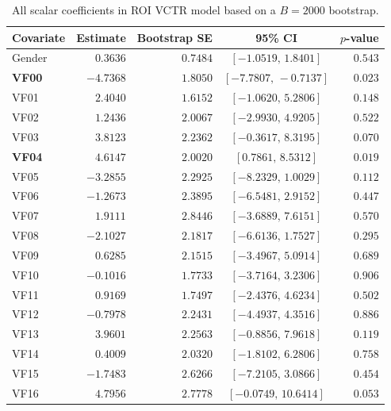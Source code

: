 \documentclass[10pt]{notes}
\begin{document}
\begin{landscape}
\begin{table}[p]
    \centering
    \setlength{\tabcolsep}{3.5pt}
    \renewcommand{\arraystretch}{1.02}
    \caption{All scalar coefficients in ROI VCTR model based
    on a $B=2000$ bootstrap.}
    \label{tab:grape-roi-xz-beta}
    \begin{minipage}[t]{0.49\linewidth}
    \centering
    \begin{tabular}{lrrcr}
    \hline
    Covariate & Estimate & Bootstrap SE & 95\% CI & $p$-value \\
    \hline
    Gender & $0.3636$ & $0.7484$ & $[-1.0519,\,1.8401]$ & $0.543$ \\
    \textbf{VF00} & $\mathbf{-4.7368}$ & $\mathbf{1.8050}$ & $\mathbf{[-7.7807,\,-0.7137]}$ & $\mathbf{0.023}$ \\
    VF01 & $2.4040$ & $1.6152$ & $[-1.0620,\,5.2806]$ & $0.148$ \\
    VF02 & $1.2436$ & $2.0067$ & $[-2.9930,\,4.9205]$ & $0.522$ \\
    VF03 & $3.8123$ & $2.2362$ & $[-0.3617,\,8.3195]$ & $0.070$ \\
    \textbf{VF04} & $\mathbf{4.6147}$ & $\mathbf{2.0020}$ & $\mathbf{[0.7861,\,8.5312]}$ & $\mathbf{0.019}$ \\
    VF05 & $-3.2855$ & $2.2925$ & $[-8.2329,\,1.0029]$ & $0.112$ \\
    VF06 & $-1.2673$ & $2.3895$ & $[-6.5481,\,2.9152]$ & $0.447$ \\
    VF07 & $1.9111$ & $2.8446$ & $[-3.6889,\,7.6151]$ & $0.570$ \\
    VF08 & $-2.1027$ & $2.1817$ & $[-6.6136,\,1.7527]$ & $0.295$ \\
    VF09 & $0.6285$ & $2.1515$ & $[-3.4967,\,5.0914]$ & $0.689$ \\
    VF10 & $-0.1016$ & $1.7733$ & $[-3.7164,\,3.2306]$ & $0.906$ \\
    VF11 & $0.9169$ & $1.7497$ & $[-2.4376,\,4.6234]$ & $0.502$ \\
    VF12 & $-0.7978$ & $2.2431$ & $[-4.4937,\,4.3516]$ & $0.886$ \\
    VF13 & $3.9601$ & $2.2563$ & $[-0.8856,\,7.9618]$ & $0.119$ \\
    VF14 & $0.4009$ & $2.0320$ & $[-1.8102,\,6.2806]$ & $0.758$ \\
    VF15 & $-1.7483$ & $2.6266$ & $[-7.2105,\,3.0866]$ & $0.454$ \\
    VF16 & $4.7956$ & $2.7778$ & $[-0.0749,\,10.6414]$ & $0.053$ \\

\end{tabular}
\end{minipage}
\end{table}
\end{landscape}
\end{document}
